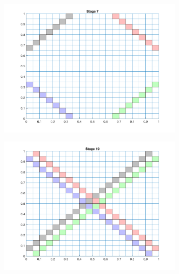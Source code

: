 \documentclass[letterpaper]{mandc2019}
\begin{document}
\begin{figure}[H]
  \centering
  \begin{subfigure}{0.49\textwidth}
  \includegraphics[scale=0.5]{figures/regular_partition_1.png}
  \end{subfigure}
  \begin{subfigure}{0.49\textwidth}
  \includegraphics[scale=0.5]{figures/regular_partition_2.png}
  \end{subfigure}
  \begin{subfigure}{0.49\textwidth}

\end{subfigure}
\end{figure}
\end{document}
